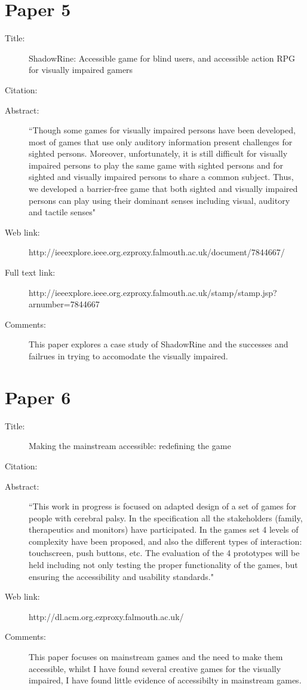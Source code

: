\documentclass{scrartcl}
\begin{document}
\section*{Paper 5}
\begin{description}
\item[Title:] ShadowRine: Accessible game for blind users, and accessible action RPG for visually impaired gamers
\item[Citation:] \cite{Matsuo}
\item[Abstract:] ``Though some games for visually impaired persons have been developed, most of games that use only auditory information present challenges for sighted persons. Moreover, unfortunately, it is still difficult for visually impaired persons to play the same game with sighted persons and for sighted and visually impaired persons to share a common subject. Thus, we developed a barrier-free game that both sighted and visually impaired persons can play using their dominant senses including visual, auditory and tactile senses"
\item[Web link:] http://ieeexplore.ieee.org.ezproxy.falmouth.ac.uk/document/7844667/
\item[Full text link:] http://ieeexplore.ieee.org.ezproxy.falmouth.ac.uk/stamp/stamp.jsp?arnumber=7844667
\item[Comments:] This paper explores a case study of ShadowRine and the successes and failrues in trying to accomodate the visually impaired.
\end{description}

\section*{Paper 6}
\begin{description}
\item[Title:] Making the mainstream accessible: redefining the game
\item[Citation:] \cite{Atkinson}
\item[Abstract:] ``This work in progress is focused on adapted design of a set of games for people with cerebral palsy. In the specification all the stakeholders (family, therapeutics and monitors) have participated. In the games set 4 levels of complexity have been proposed, and also the different types of interaction: touchscreen, push buttons, etc. The evaluation of the 4 prototypes will be held including not only testing the proper functionality of the games, but ensuring the accessibility and usability standards."
\item[Web link:] http://dl.acm.org.ezproxy.falmouth.ac.uk/
\item[Comments:] This paper focuses on mainstream games and the need to make them accessible, whilst I have found several creative games for the visually impaired, I have found little evidence of accessibilty in mainstream games.
\end{description}
\end{document}

